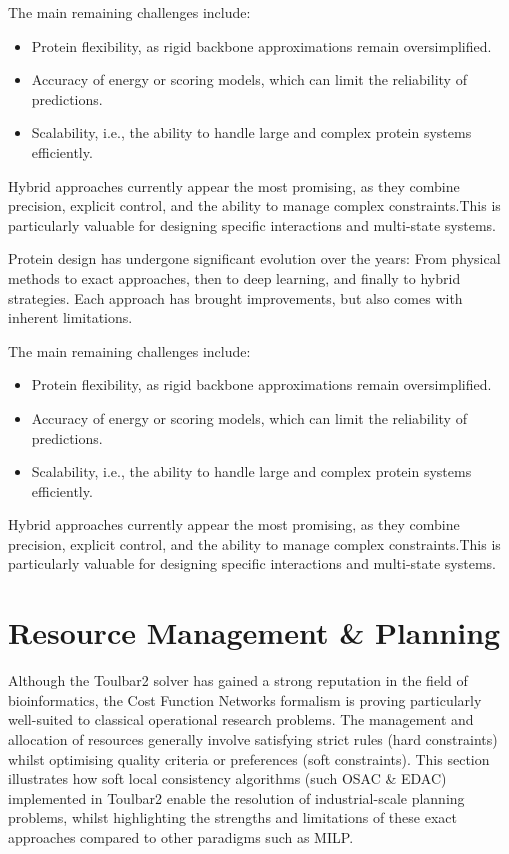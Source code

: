 \documentclass[runningheads]{llncs}
\begin{document}
The main remaining challenges include:

\begin{itemize}
    \item Protein flexibility, as rigid backbone approximations remain oversimplified.
    \item Accuracy of energy or scoring models, which can limit the reliability of predictions.
    \item Scalability, i.e., the ability to handle large and complex protein systems efficiently.
\end{itemize}

Hybrid approaches currently appear the most promising, as they combine precision, explicit control, and the ability to manage complex constraints.This is particularly valuable for designing specific interactions and multi-state systems.

Protein design has undergone significant evolution over the years:
From physical methods to exact approaches, then to deep learning, and finally to hybrid strategies.
Each approach has brought improvements, but also comes with inherent limitations.

The main remaining challenges include:

\begin{itemize}
    \item Protein flexibility, as rigid backbone approximations remain oversimplified.
    \item Accuracy of energy or scoring models, which can limit the reliability of predictions.
    \item Scalability, i.e., the ability to handle large and complex protein systems efficiently.
\end{itemize}

Hybrid approaches currently appear the most promising, as they combine precision, explicit control, and the ability to manage complex constraints.This is particularly valuable for designing specific interactions and multi-state systems.


\section{Resource Management \& Planning}

Although the Toulbar2 solver has gained a strong reputation in the field of bioinformatics, 
the Cost Function Networks formalism is proving particularly well-suited to classical operational research problems. 
The management and allocation of resources generally involve satisfying strict rules (hard constraints) 
whilst optimising quality criteria or preferences (soft constraints). 
This section illustrates how soft local consistency algorithms (such \ac{OSAC} \& \ac{EDAC}) implemented in Toulbar2 
enable the resolution of industrial-scale planning problems, whilst highlighting the strengths and limitations 
of these exact approaches compared to other paradigms such as \ac{MILP}.
\end{document}
